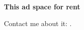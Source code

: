 \vspace*{\fill}

\Large \textbf{This ad space for rent}

\bigskip
\bigskip
\bigskip

Contact me about it: \EMAIL.

\normalsize

\bigskip
\bigskip
\bigskip

\vspace*{\fill}
\vfill
